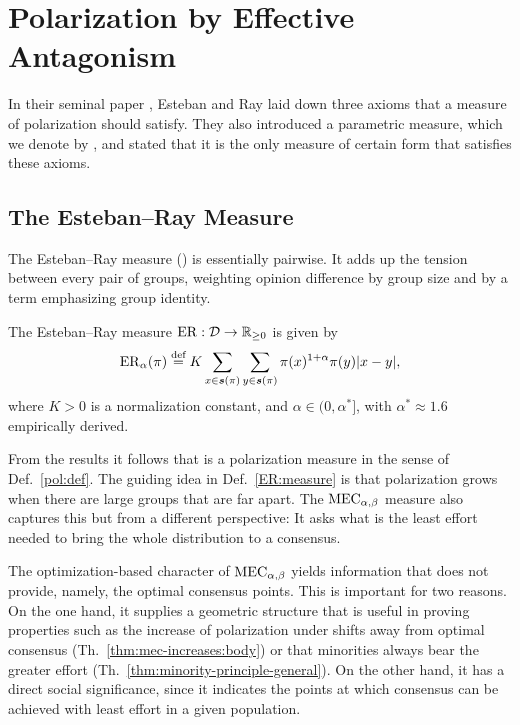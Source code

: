 \section{Polarization by Effective Antagonism}\label{sec:er-comparison}

In their seminal paper \cite{esteban1994measurement}, Esteban and Ray laid down three axioms that a measure of polarization should satisfy. They also introduced a parametric measure, which we denote by \ERLabel, and stated that it is the only measure of certain form that satisfies these axioms.

\subsection{The Esteban--Ray Measure}

The Esteban--Ray measure (\ERLabel) is essentially pairwise. It adds up the tension between every pair of groups, weighting opinion difference by group size and by a term emphasizing group identity.

\begin{definition}\label{ER:measure} The Esteban--Ray measure \(\ERLabel:\Dset \to \PositiveReals\) is given by
\begin{equation}
\ER(\pi) \defsymbol K \sum_{x\in\support(\pi)}\sum_{y\in\support(\pi)}\pi(x)^{1+\alpha}\pi(y)|x - y|,
\end{equation}
where $K > 0$ is a normalization constant, and $\alpha \in (0, \alpha^*]$, with $\alpha^* \approx 1.6$ empirically derived.
\end{definition}
From the results \cite{esteban1994measurement} it follows that \ERLabel{} is a polarization measure in the sense of Def.~\ref{pol:def}. The guiding idea in Def.~\ref{ER:measure} is that polarization grows when there are large groups that are far apart. The $\MEC$ measure also captures this but from a different perspective: It asks what is the least effort needed to bring the whole distribution to a consensus.

The optimization-based character of $\MEC$ yields information that \ERLabel{} does not provide, namely, the optimal consensus points. This is important for two reasons. On the one hand, it supplies a geometric structure that is useful in proving properties such as the increase of polarization under shifts away from optimal consensus (Th.~\ref{thm:mec-increases:body}) or that minorities always bear the greater effort (Th.~\ref{thm:minority-principle-general}). On the other hand, it has a direct social significance, since it indicates the points at which consensus can be achieved with least effort in a given population.

